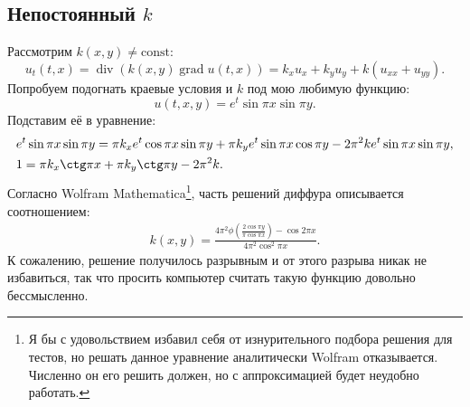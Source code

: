 \documentclass[14pt,a4paper]{extarticle}
\newcommand{\1}{\mathbbm{1}}
\begin{document}
\subsection{Непостоянный $k$}
Рассмотрим $k(x,y) \neq \text{const}$:
\begin{equation*} 
    u_t(t, x) = \operatorname{div} (k(x,y) \operatorname{grad} u(t, x)) = k_x u_x + k_y u_y + k(u_{xx}+u_{yy}).
\end{equation*}
Попробуем подогнать краевые условия и $k$ под мою любимую функцию:
$$
u(t, x, y) = e^t \sin \pi x \sin \pi y.
$$
Подставим её в уравнение:
\begin{align*} 
    & e^t \sin \pi x \sin \pi y = \pi k_x e^t \cos \pi x \sin \pi y + \pi k_y e^t \sin \pi x \cos \pi y 
    -2 \pi ^2 k e^t \sin \pi x \sin \pi y, \\
    & 1 = \pi k_x \ctg \pi x  + \pi k_y \ctg \pi y 
    -2 \pi ^2 k.
\end{align*}
Согласно Wolfram Mathematica\footnote{Я бы с удовольствием избавил себя от изнурительного подбора решения для тестов, 
но решать данное уравнение аналитически Wolfram отказывается. Численно он его решить должен, но с аппроксимацией будет 
неудобно работать.}, часть решений диффура описывается соотношением:
\begin{align*} 
    k(x,y) = \frac{4 \pi ^2 \phi(\frac{2 \cos \pi y}{\pi \cos \pi x})-\cos 2 \pi x}{4 \pi ^2 \cos ^2 \pi x }.
\end{align*}
К сожалению, решение получилось разрывным и от этого разрыва никак не избавиться, так что просить компьютер считать такую функцию довольно бессмысленно.    
 
\end{document}
